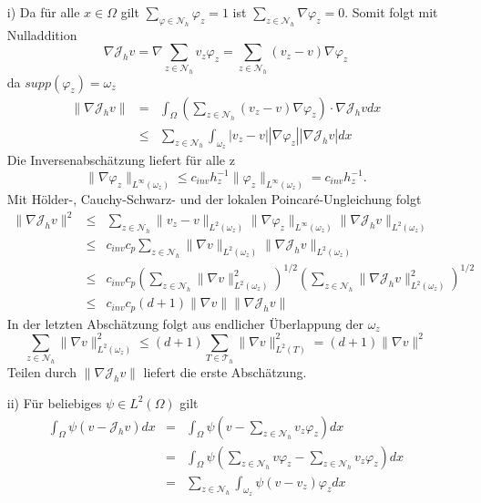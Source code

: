 \begin{itemize}
	\item[i)] Da für alle $x \in\Omega$ gilt $\sum_{\varphi\in\mathscr{N}_h}\varphi_z = 1$  ist $\sum_{z\in\mathscr{N}_h}\nabla \varphi_z=0$. Somit folgt mit Nulladdition
	\[
	\nabla \mathscr{J}_hv = \nabla \sum_{z\in \mathscr{N}_h}v_z\varphi_z = \sum_{z\in \mathscr{N}_h}(v_z-v) \nabla\varphi_z
	\]
	da $supp(\varphi_z)=\omega_z$
	\begin{eqnarray*}
		\| \nabla \mathscr{J}_hv\| &=& \int_{\Omega}(\sum_{z\in \mathscr{N}_h}(v_z-v) \nabla\varphi_z)\cdot \nabla \mathscr{J}_hvdx\\
		&\leq& \sum_{z\in \mathscr{N}_h}\int_{\omega_z}|v_z-v| |\nabla\varphi_z||\nabla \mathscr{J}_hv|dx
	\end{eqnarray*}
Die Inversenabschätzung liefert für alle z
\[
\|\nabla\varphi_z\|_{L^\infty(\omega_z)}\leq c_{inv}h^{-1}_z\|\varphi_z\|_{L^\infty(\omega_z)} =c_{inv}h^{-1}_z.
\]
Mit Hölder-, Cauchy-Schwarz- und der lokalen Poincaré-Ungleichung folgt
\begin{eqnarray*}
	\|\nabla\mathscr{J}_hv\|^2 &\leq&\sum_{z\in \mathscr{N}_h}\|v_z-v\|_{L^2(\omega_z)} \|\nabla\varphi_z\|_{L^\infty(\omega_z)}\|\nabla \mathscr{J}_hv\|_{L^2(\omega_z)}\\
	&\leq&c_{inv}c_p\sum_{z\in \mathscr{N}_h}\|\nabla v\|_{L^2(\omega_z)} \|\nabla \mathscr{J}_hv\|_{L^2(\omega_z)} \\
	&\leq&c_{inv}c_p\left(\sum_{z\in \mathscr{N}_h}\|\nabla v\|_{L^2(\omega_z)}^2\right)^{1/2} \left(\sum_{z\in \mathscr{N}_h} \|\nabla \mathscr{J}_hv\|_{L^2(\omega_z)}^2\right)^{1/2} \\
	&\leq&c_{inv}c_p(d+1)\|\nabla v\| \|\nabla \mathscr{J}_hv\|
\end{eqnarray*} 
In der letzten Abschätzung folgt aus endlicher Überlappung der $\omega_z$
\[
\sum_{z\in \mathscr{N}_h}\|\nabla v\|_{L^2(\omega_z)}^2 \leq (d+1)\sum_{T\in\mathscr{T}_h} \|\nabla v\|^2_{L^2(T)} = (d+1)\|\nabla v\|^2
\]
Teilen durch $\|\nabla\mathscr{J}_hv\|$ liefert die erste Abschätzung.
\item[ii)] Für beliebiges $\psi \in L^2(\Omega)$ gilt
\begin{eqnarray*}
	\int_{\Omega}\psi(v-\mathscr{J}_hv)dx &=& \int_{\Omega}\psi\left(v-\sum_{z\in \mathscr{N}_h}v_z\varphi_z\right)dx \\
	 &=& \int_{\Omega}\psi\left(\sum_{z\in \mathscr{N}_h}v\varphi_z-\sum_{z\in \mathscr{N}_h}v_z\varphi_z\right)dx\\
	 &=&\sum_{z\in \mathscr{N}_h}\int_{\omega_z} \psi (v-v_z)\varphi_zdx \\

\end{eqnarray*}
\end{itemize}

